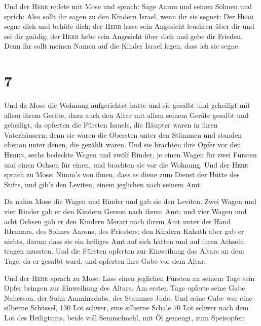  Und der \textsc{Herr} redete mit Mose und sprach:
 Sage Aaron und seinen Söhnen und sprich: Also sollt ihr
sagen zu den Kindern Israel, wenn ihr sie segnet:  Der
\textsc{Herr} segne dich und behüte dich;  der
\textsc{Herr} lasse sein Angesicht leuchten über dir und sei dir gnädig;
 der \textsc{Herr} hebe sein Angesicht über dich und gebe
dir Frieden.  Denn ihr sollt meinen Namen auf die Kinder
Israel legen, dass ich sie segne.

\hypertarget{section-6}{%
\section{7}\label{section-6}}

 Und da Mose die Wohnung aufgerichtet hatte und sie
gesalbt und geheiligt mit allem ihrem Geräte, dazu auch den Altar mit
allem seinem Geräte gesalbt und geheiligt,  da opferten
die Fürsten Israels, die Häupter waren in ihren Vaterhäusern; denn sie
waren die Obersten unter den Stämmen und standen obenan unter denen, die
gezählt waren.  Und sie brachten ihre Opfer vor den
\textsc{Herrn}, sechs bedeckte Wagen und zwölf Rinder, je einen Wagen
für zwei Fürsten und einen Ochsen für einen, und brachten sie vor die
Wohnung.  Und der \textsc{Herr} sprach zu Mose:
 Nimm's von ihnen, dass es diene zum Dienst der Hütte des
Stifts, und gib's den Leviten, einem jeglichen nach seinem Amt.

 Da nahm Mose die Wagen und Rinder und gab sie den
Leviten.  Zwei Wagen und vier Rinder gab er den Kindern
Gerson nach ihrem Amt;  und vier Wagen und acht Ochsen gab
er den Kindern Merari nach ihrem Amt unter der Hand Ithamars, des Sohnes
Aarons, des Priesters;  den Kindern Kahath aber gab er
nichts, darum dass sie ein heiliges Amt auf sich hatten und auf ihren
Achseln tragen mussten.  Und die Fürsten opferten zur
Einweihung das Altars an dem Tage, da er gesalbt ward, und opferten ihre
Gabe vor dem Altar.

 Und der \textsc{Herr} sprach zu Mose: Lass einen
jeglichen Fürsten an seinem Tage sein Opfer bringen zur Einweihung des
Altars.  Am ersten Tage opferte seine Gabe Nahesson, der
Sohn Amminadabs, des Stammes Juda.  Und seine Gabe war
eine silberne Schüssel, 130 Lot schwer, eine silberne Schale 70 Lot
schwer nach dem Lot des Heiligtums, beide voll Semmelmehl, mit Öl
gemengt, zum Speisopfer;

